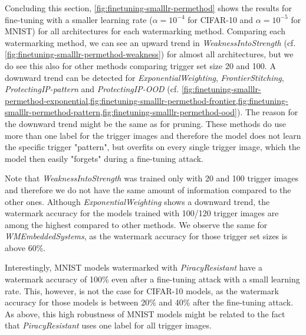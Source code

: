 Concluding this section, \cref{fig:finetuning-smalllr-permethod} shows the results for fine-tuning with a smaller learning rate ($\alpha=10^{-4}$ for CIFAR-10 and $\alpha=10^{-5}$ for MNIST) for all architectures for each watermarking method. Comparing each watermarking method, we can see an upward trend in \textit{WeaknessIntoStrength} (cf. \cref{fig:finetuning-smalllr-permethod-weakness}) for almost all architectures, but we do see this also for other methods comparing trigger set size 20 and 100. A downward trend can be detected for \textit{ExponentialWeighting}, \textit{FrontierStitching}, \textit{ProtectingIP-pattern} and \textit{ProtectingIP-OOD} (cf. \cref{fig:finetuning-smalllr-permethod-exponential,fig:finetuning-smalllr-permethod-frontier,fig:finetuning-smalllr-permethod-pattern,fig:finetuning-smalllr-permethod-ood}). The reason for the downward trend might be the same as for pruning. These methods do use more than one label for the trigger images and therefore the model does not learn the specific trigger "pattern", but overfits on every single trigger image, which the model then easily "forgets" during a fine-tuning attack.

Note that \textit{WeaknessIntoStrength} was trained only with 20 and 100 trigger images and therefore we do not have the same amount of information compared to the other ones. Although \textit{ExponentialWeighting} shows a downward trend, the watermark accuracy for the models trained with 100/120 trigger images are among the highest compared to other methods. We observe the same for \textit{WMEmbeddedSystems}, as the watermark accuracy for those trigger set sizes is above 60\%.

Interestingly, MNIST models watermarked with \textit{PiracyResistant} have a watermark accuracy of 100\% even after a fine-tuning attack with a small learning rate. This, however, is not the case for CIFAR-10 models, as the watermark accuracy for those models is between 20\% and 40\% after the fine-tuning attack. As above, this high robustness of MNIST models might be related to the fact that \textit{PiracyResistant} uses one label for all trigger images. 





